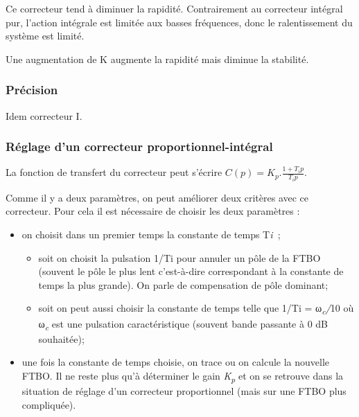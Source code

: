 Ce correcteur tend à diminuer la rapidité. Contrairement au correcteur intégral pur, l'action intégrale est limitée aux basses fréquences, donc le ralentissement du système est limité.

Une augmentation de K augmente la rapidité mais diminue la stabilité.

\hypertarget{pruxe9cision-2}{%
\subsubsection*{Précision}\label{pruxe9cision-2}}

Idem correcteur I.

\hypertarget{ruxe9glage-dun-correcteur-proportionnel-intuxe9gral}{%
\subsubsection*{Réglage d'un correcteur proportionnel-intégral}\label{ruxe9glage-dun-correcteur-proportionnel-intuxe9gral}}

La fonction de transfert du correcteur peut s'écrire \(C(p) = K_{p}.\frac{1 + T_{i}p}{T_{i}p}\).

Comme il y a deux paramètres, on peut améliorer deux critères avec ce correcteur. Pour cela il est nécessaire de choisir les deux paramètres :

\begin{itemize}
\item
  on choisit dans un premier temps la constante de temps T\emph{i~};

  \begin{itemize}
  \item
    soit on choisit la pulsation 1/Ti pour annuler un pôle de la FTBO (souvent le pôle le plus lent c'est-à-dire correspondant à la constante de temps la plus grande). On parle de compensation de pôle dominant;
  \item
    soit on peut aussi choisir la constante de temps telle que 1/Ti = ω\emph{\textsubscript{c}/}10 où ω\emph{\textsubscript{c}} est une pulsation caractéristique (souvent bande passante à 0 dB souhaitée);
  \end{itemize}
\item
  une fois la constante de temps choisie, on trace ou on calcule la nouvelle FTBO. Il ne reste plus qu'à déterminer le gain \emph{K\textsubscript{p}} et on se retrouve dans la situation de réglage d'un correcteur proportionnel (mais sur une FTBO plus compliquée).
\end{itemize}


